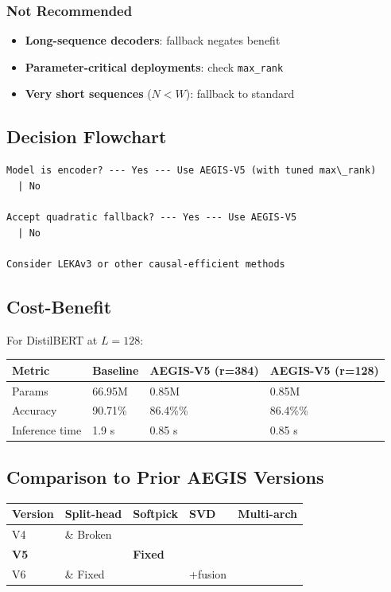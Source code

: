 \subsubsection{Not Recommended}
\begin{itemize}
\item \textbf{Long-sequence decoders}: fallback negates benefit
\item \textbf{Parameter-critical deployments}: check \texttt{max\_rank}
\item \textbf{Very short sequences} ($N < W$): fallback to standard

\end{itemize}
\subsection{Decision Flowchart}

\begin{lstlisting}
Model is encoder? --- Yes --- Use AEGIS-V5 (with tuned max\_rank)
  | No
   
Accept quadratic fallback? --- Yes --- Use AEGIS-V5
  | No
   
Consider LEKAv3 or other causal-efficient methods
\end{lstlisting}

\subsection{Cost-Benefit}

For DistilBERT at $L = 128$:

\begin{table}[H]
\centering
\small
\begin{tabular}{llll}
\toprule
\textbf{Metric} & \textbf{Baseline} & \textbf{AEGIS-V5 (r=384)} & \textbf{AEGIS-V5 (r=128)} \\
\midrule
Params & 66.95M & 0.85M & 0.85M \\
Accuracy & 90.71\% & 86.4\%\% & 86.4\%\% \\
Inference time & 1.9 s & 0.85 s & 0.85 s \\
\bottomrule
\end{tabular}
\end{table}

\subsection{Comparison to Prior AEGIS Versions}

\begin{table}[H]
\centering
\small
\begin{tabular}{lllll}
\toprule
\textbf{Version} & \textbf{Split-head} & \textbf{Softpick} & \textbf{SVD} & \textbf{Multi-arch} \\
\midrule
V4 &  \& Broken &  &  \\
\textbf{V5} & \textbf{ } & \textbf{Fixed} & \textbf{ } & \textbf{ } \\
V6 &  \& Fixed &  & +fusion \\
\bottomrule
\end{tabular}
\end{table}


